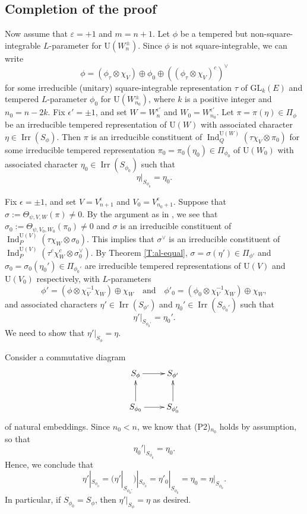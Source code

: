 \documentclass[11pt]{amsart}
\numberwithin{equation}{section}
\theoremstyle{plain}
\theoremstyle{definition}
\theoremstyle{remark}
\def\Ind{\operatorname{Ind}}
\def\Irr{\operatorname{Irr}}
\def\GL{\mathrm{GL}}
\def\U{\mathrm{U}}
\begin{document}
\subsection{Completion of the proof}

Now assume that $\varepsilon = +1$ and $m = n+1$.
Let $\phi$ be a tempered but non-square-integrable $L$-parameter for $\U(W_n^\pm)$.
Since $\phi$ is not square-integrable, we can write
\[
 \phi = (\phi_\tau \otimes \chi_V) \oplus \phi_0 \oplus
 ((\phi_\tau \otimes \chi_V)^c)^\vee
\]
for some irreducible (unitary) square-integrable representation $\tau$ of $\GL_k(E)$ and tempered $L$-parameter $\phi_0$ for $\U(W_{n_0}^\pm)$,
where $k$ is a positive integer and $n_0 = n-2k$.
Fix $\epsilon' = \pm 1$, and set $W = W_n^{\epsilon'}$ and $W_0 = W_{n_0}^{\epsilon'}$.
Let $\pi = \pi(\eta) \in \Pi_{\phi}$ be an irreducible tempered representation of $\U(W)$ with associated character $\eta \in \Irr(S_{\phi})$.
Then $\pi$ is an irreducible constituent of $\Ind^{\U(W)}_Q(\tau \chi_V \otimes \pi_0)$ for some irreducible tempered representation $\pi_0 = \pi_0(\eta_0) \in \Pi_{\phi_0}$ of $\U(W_0)$ with associated character $\eta_0 \in \Irr(S_{\phi_0})$ such that
\[
 \eta|_{S_{\phi_0}} = \eta_0. 
\]

Fix $\epsilon = \pm 1$, and set $V = V_{n+1}^{\epsilon}$ and $V_0 = V_{n_0+1}^{\epsilon}$.
Suppose that $\sigma := \Theta_{\psi, V, W}(\pi) \ne 0$.
By the argument as in \cite[pp.~1674--1676]{gs}, we see that $\sigma_0 := \Theta_{\psi,V_0, W_0}(\pi_0) \ne 0$ and $\sigma$ is an irreducible constituent of $\Ind^{\U(V)}_P(\tau \chi_W \otimes \sigma_0)$.
This implies that $\sigma^\vee$ is an irreducible constituent of $\Ind^{\U(V)}_P(\tau^c \chi_W^c \otimes \sigma_0^\vee)$.
By Theorem \ref{T:al-equal}, $\sigma  = \sigma(\eta') \in \Pi_{\phi'}$ and $\sigma_0 = \sigma_0(\eta_0') \in \Pi_{\phi_0'}$ are irreducible tempered representations of $\U(V)$ and $\U(V_0)$ respectively, with $L$-parameters
\[
 \phi' = (\phi \otimes \chi_V^{-1} \chi_W) \oplus \chi_W \quad \text{and} \quad
 \phi'_0 = (\phi_0 \otimes \chi_V^{-1} \chi_W) \oplus \chi_W, 
\]
and associated characters $\eta' \in \Irr(S_{\phi'})$ and $\eta_0' \in \Irr(S_{\phi_0'})$ such that
\[
 \eta'|_{S_{\phi_0'}} = \eta_0'.
\]
We need to show that $\eta'|_{S_{\phi}} = \eta$.

Consider a commutative diagram
\[
 \xymatrix{
  S_{\phi} \ar@{->}[r] & S_{\phi'} \\
  S_{\phi_0} \ar@{->}[u] \ar@{->}[r] & S_{\phi_0'} \ar@{->}[u]}
\]
of natural embeddings.
Since $n_0 < n$, we know that (P2)$_{n_0}$ holds by assumption, so that 
\[
 \eta_0'|_{S_{\phi_0}} = \eta_0.
\]
Hence, we conclude that 
\[
 \eta'|_{S_{\phi_0}} = (\eta'|_{S_{\phi_0'}})|_{S_{\phi_0}}
 = \eta'_0|_{S_{\phi_0}} = \eta_0 = \eta|_{S_{\phi_0}}.
\]
In particular, if $S_{\phi_0} = S_{\phi}$, then $\eta'|_{S_\phi} = \eta$ as desired.
\end{document}
